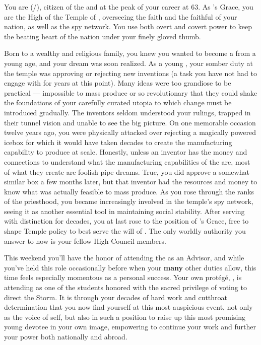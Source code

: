 \documentclass[char]{GL2020}
\begin{document}
\name{\cAntiChup{}}

You are \cAntiChup{\full} (\cAntiChup{\they}/\cAntiChup{\them}), citizen of the \pTech{} and at the peak of your career at 63. As \cTechGod{}'s Grace, you are the High \cAntiChup{\Cleric} of the Temple of \cTechGod{}, overseeing the faith and the faithful of your nation, as well as the \pTech{} spy network. You use both overt and covert power to keep the beating heart of the nation under your finely gloved thumb.

Born to a wealthy and religious family, you knew you wanted to become a \cAntiChup{\cleric} from a young age, and your dream was soon realized. As a young \cAntiChup{\cleric}, your somber duty at the temple was approving or rejecting new inventions (a task you have not had to engage with for years at this point). Many ideas were too grandiose to be practical — impossible to mass produce or so revolutionary that they could shake the foundations of your carefully curated utopia to which change must be introduced gradually. The inventors seldom understood your rulings, trapped in their tunnel vision and unable to see the big picture. On one memorable occasion twelve years ago, you were physically attacked over rejecting a magically powered icebox for which it would have taken decades to create the manufacturing capability to produce at scale. Honestly, unless an inventor has the money and connections to understand what the manufacturing capabilities of the \pTech{} are, most of what they create are foolish pipe dreams. True, you did approve a somewhat similar box a few months later, but that inventor had the resources and money to know what was actually feasible to mass produce. As you rose through the ranks of the priesthood, you became increasingly involved in the temple's spy network, seeing it as another essential tool in maintaining social stability. After serving with distinction for decades, you at last rose to the position of \cTechGod{}'s Grace, free to shape Temple policy to best serve the will of \cTechGod{}. The only worldly authority you answer to now is your fellow High Council members.

This weekend you'll have the honor of attending the \pSchool{} as an Advisor, and while you've held this role occasionally before when your \textbf{many} other duties allow, this time feels especially momentous as a personal success. Your own protégé, \cScholarship{\full}, is attending as one of the students honored with the sacred privilege of voting to direct the Storm. It is through your decades of hard work and cutthroat determination that you now find yourself at this most auspicious event, not only as the voice of \cTechGod{} \cTechGod{\them}self, but also in such a position to raise up this most promising young devotee in your own image, empowering \cScholarship{\them} to continue your work and further your power both nationally and abroad.  
\end{document}
